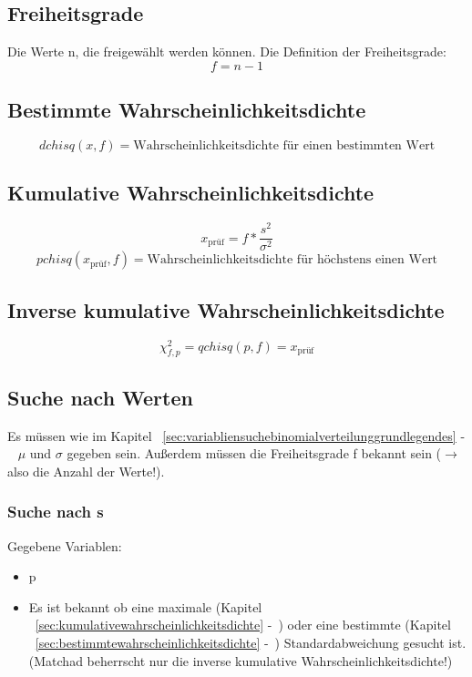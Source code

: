 \documentclass[a4paper,10pt]{article}
\begin{document}
\subsection{Freiheitsgrade}
Die Werte n, die freigewählt werden können. Die Definition der Freiheitsgrade:
\begin{equation}
  f = n - 1
\end{equation}

\subsection{Bestimmte Wahrscheinlichkeitsdichte}
\label{sec:bestimmtewahrscheinlichkeitsdichte}
\begin{equation}
  dchisq(x, f) = \text{Wahrscheinlichkeitsdichte für einen bestimmten Wert}
\end{equation}

\subsection{Kumulative Wahrscheinlichkeitsdichte}
\label{sec:kumulativewahrscheinlichkeitsdichte}
\begin{equation}
    x_{\text{prüf}} = f * \frac{s^2}{\sigma^2}
\end{equation}
\begin{equation}
  pchisq(x_{\text{prüf}}, f) = \text{Wahrscheinlichkeitsdichte für höchstens einen Wert}
\end{equation}

\subsection{Inverse kumulative Wahrscheinlichkeitsdichte}
\begin{equation}
  \chi^2_{f,p} = qchisq(p, f) = x_{\text{prüf}}
\end{equation}

\subsection{Suche nach Werten}
Es müssen wie im Kapitel
~\autoref{sec:variabliensuchebinomialverteilunggrundlegendes}
-~ $ \mu $
und $ \sigma $ gegeben sein. Außerdem müssen die Freiheitsgrade f
bekannt sein ($ \rightarrow $ also die Anzahl der Werte!).

\subsubsection{Suche nach s}
\label{sec:chisuchenachs}
Gegebene Variablen:
\begin{itemize}
\item p
\item Es ist bekannt ob eine maximale (Kapitel
~\autoref{sec:kumulativewahrscheinlichkeitsdichte}
-~) oder eine
bestimmte (Kapitel ~\autoref{sec:bestimmtewahrscheinlichkeitsdichte}
-~) Standardabweichung
gesucht ist. (Matchad beherrscht nur die inverse kumulative
Wahrscheinlichkeitsdichte!)
\end{itemize}
\end{document}
